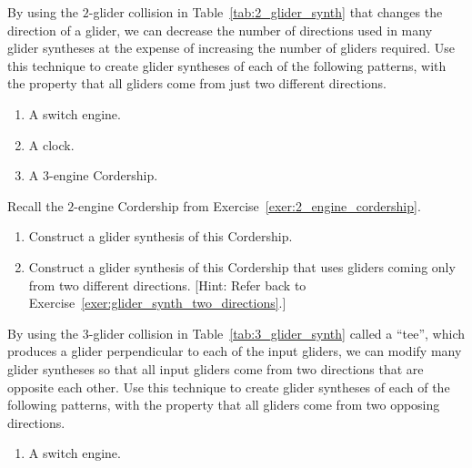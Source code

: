 \begin{multicols}{2}
\begin{problem}\label{exer:glider_synth_two_directions}
	By using the $2$-glider collision in Table~\ref{tab:2_glider_synth} that changes the direction of a glider, we can decrease the number of directions used in many glider syntheses at the expense of increasing the number of gliders required. Use this technique to create glider syntheses of each of the following patterns, with the property that all gliders come from just two different directions.
	\begin{enumerate}[label=(\alph*)]
		\item A switch engine.
		
		\item A clock.
		
		\item A $3$-engine Cordership.
	\end{enumerate}
\end{problem}


\mfilbreak


\begin{problem}\label{exer:2_engine_cordership_synthesis}
	Recall the $2$-engine Cordership from Exercise~\ref{exer:2_engine_cordership}.\smallskip
	
	\begin{enumerate}[label=(\alph*)]
		\item Construct a glider synthesis of this Cordership.
		
		\item Construct a glider synthesis of this Cordership that uses gliders coming only from two different directions. [Hint: Refer back to Exercise~\ref{exer:glider_synth_two_directions}.]
	\end{enumerate}
\end{problem}


\mfilbreak


\begin{problem}\label{exer:glider_synth_tee}
	By using the $3$-glider collision in Table~\ref{tab:3_glider_synth} called a ``tee'', which produces a glider perpendicular to each of the input gliders, we can modify many glider syntheses so that all input gliders come from two directions that are opposite each other. Use this technique to create glider syntheses of each of the following patterns, with the property that all gliders come from two opposing directions.
	\begin{enumerate}[label=(\alph*)]
		\item A switch engine.
		

\end{enumerate}
\end{problem}
\end{multicols}
